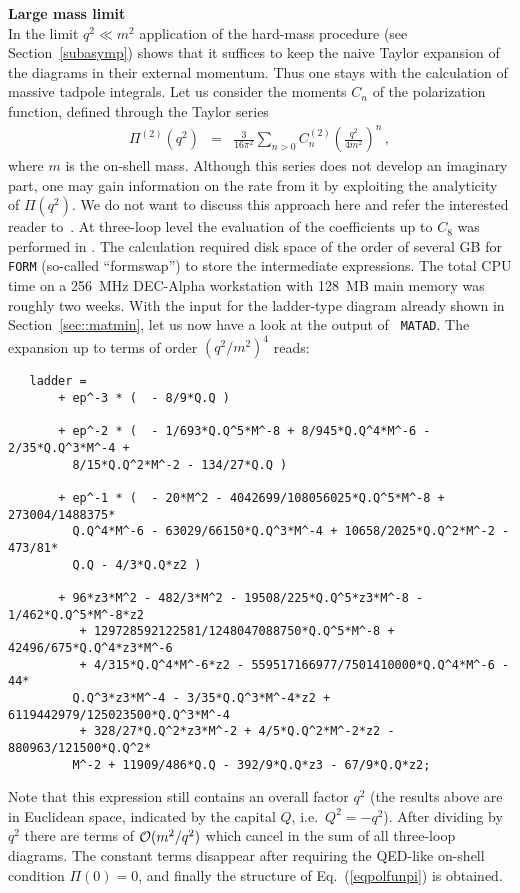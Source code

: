 %
\vspace{4ex}\noindent
{\bf Large mass limit}\\[2ex]
%
In the limit $q^2\ll m^2$ application of the hard-mass procedure (see
Section~\ref{subasymp}) shows that it suffices to keep the naive Taylor expansion
of the diagrams in their external momentum. Thus one stays with the
calculation of massive tadpole integrals. Let us consider the moments $C_n$ of
the polarization function, defined through the Taylor series
\begin{eqnarray}
\Pi^{(2)}(q^2) &=& 
              \frac{3}{16\pi^2}
              \sum_{n>0} C_{n}^{(2)} \left(\frac{q^2}{4m^2}\right)^n
\,,
\label{eqpolfunpi}
\end{eqnarray}
where $m$ is the on-shell mass.
Although this series does not develop an imaginary part, one may gain
information on the rate from it by exploiting the analyticity of
$\Pi(q^2)$. We do not want to discuss this approach here and refer the
interested reader to~\cite{BaiBro95,CheKueSte96}.  At three-loop level
the evaluation of the coefficients up to $C_8$ was performed in
\cite{CheKueSte96}. The calculation required disk space of the order of
several GB for {\tt FORM} (so-called ``formswap'') to store the
intermediate expressions.  The total CPU time on a 256~MHz DEC-Alpha
workstation with 128~MB main memory was roughly two weeks.  With the
input for the ladder-type diagram already shown in
Section~\ref{sec::matmin}, let us now have a look at the output of {\tt
  MATAD}. The expansion up to terms of order $(q^2/m^2)^4$ reads:
\begin{verbatim}
   ladder =
       + ep^-3 * (  - 8/9*Q.Q )

       + ep^-2 * (  - 1/693*Q.Q^5*M^-8 + 8/945*Q.Q^4*M^-6 - 2/35*Q.Q^3*M^-4 + 
         8/15*Q.Q^2*M^-2 - 134/27*Q.Q )

       + ep^-1 * (  - 20*M^2 - 4042699/108056025*Q.Q^5*M^-8 + 273004/1488375*
         Q.Q^4*M^-6 - 63029/66150*Q.Q^3*M^-4 + 10658/2025*Q.Q^2*M^-2 - 473/81*
         Q.Q - 4/3*Q.Q*z2 )

       + 96*z3*M^2 - 482/3*M^2 - 19508/225*Q.Q^5*z3*M^-8 - 1/462*Q.Q^5*M^-8*z2
          + 129728592122581/1248047088750*Q.Q^5*M^-8 + 42496/675*Q.Q^4*z3*M^-6
          + 4/315*Q.Q^4*M^-6*z2 - 559517166977/7501410000*Q.Q^4*M^-6 - 44*
         Q.Q^3*z3*M^-4 - 3/35*Q.Q^3*M^-4*z2 + 6119442979/125023500*Q.Q^3*M^-4
          + 328/27*Q.Q^2*z3*M^-2 + 4/5*Q.Q^2*M^-2*z2 - 880963/121500*Q.Q^2*
         M^-2 + 11909/486*Q.Q - 392/9*Q.Q*z3 - 67/9*Q.Q*z2;
\end{verbatim}
Note that this expression still contains an overall factor $q^2$ (the
results above are in Euclidean space, indicated by the capital $Q$,
i.e.\ $Q^2 = -q^2$).  After dividing by $q^2$ there are terms of ${\cal
  O}(m^2/q^2)$ which cancel in the sum of all three-loop diagrams.  The
constant terms disappear after requiring the QED-like on-shell condition
$\Pi(0)=0$, and finally the structure of Eq.~(\ref{eqpolfunpi}) is
obtained.

